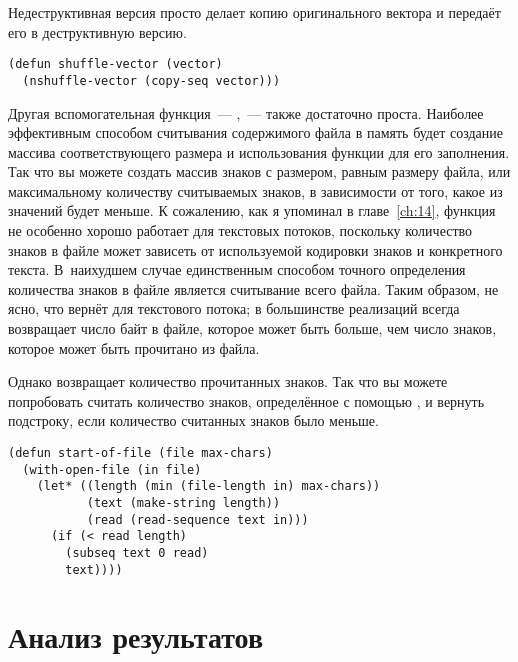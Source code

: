 Недеструктивная версия просто делает копию оригинального вектора и передаёт его в
деструктивную версию.

\begin{lstlisting}
(defun shuffle-vector (vector)
  (nshuffle-vector (copy-seq vector)))
\end{lstlisting}

Другая вспомогательная функция~--- ,~--- также достаточно проста.
Наиболее эффективным способом считывания содержимого файла в память будет создание
массива соответствующего размера и использования функции  для его
заполнения.  Так что вы можете создать массив знаков с размером, равным размеру файла, или
максимальному количеству считываемых знаков, в зависимости от того, какое из значений
будет меньше.  К сожалению, как я упоминал в главе~\ref{ch:14}, функция 
не особенно хорошо работает для текстовых потоков, поскольку количество знаков в файле
может зависеть от используемой кодировки знаков и конкретного текста.  В~наихудшем случае
единственным способом точного определения количества знаков в файле является считывание
всего файла.  Таким образом, не ясно, что вернёт  для текстового потока; в
большинстве реализаций  всегда возвращает число байт в файле, которое
может быть больше, чем число знаков, которое может быть прочитано из файла.

Однако  возвращает количество прочитанных знаков.  Так что вы можете
попробовать считать количество знаков, определённое с помощью , и вернуть
подстроку, если количество считанных знаков было меньше.

\begin{lstlisting}
(defun start-of-file (file max-chars)
  (with-open-file (in file)
    (let* ((length (min (file-length in) max-chars))
           (text (make-string length))
           (read (read-sequence text in)))
      (if (< read length)
        (subseq text 0 read)
        text))))
\end{lstlisting}


\section{Анализ результатов}

